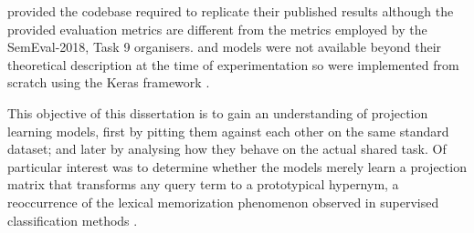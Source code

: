 \citeauthor{ustalov2017negative} provided the codebase required to replicate their published results although the provided evaluation metrics are different from the metrics employed by the SemEval-2018, Task 9 organisers.  \citep{yamane2016distributional} and \citep{bernier2018crim} models were not available beyond their theoretical description at the time of experimentation so were implemented from scratch using the Keras framework \citep{chollet2015keras}.

This objective of this dissertation is to gain an understanding of projection learning models, first by pitting them against each other on the same standard dataset; and later by analysing how they behave on the actual shared task.  Of particular interest was to determine whether the models merely learn a projection matrix that transforms any query term to a prototypical hypernym, a reoccurrence of the lexical memorization phenomenon observed in supervised classification methods \citep{levy2015supervised}.
